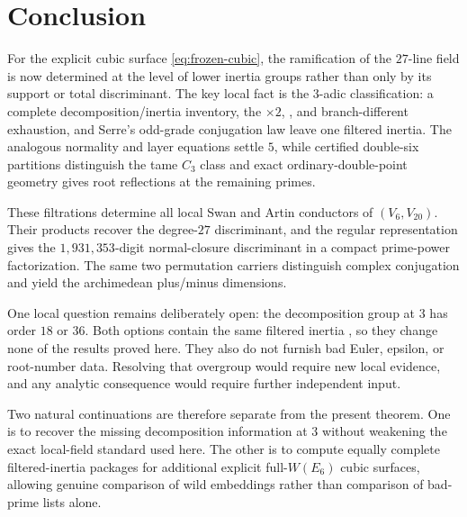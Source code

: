 \section{Conclusion}
\label{sec:conclusion}

For the explicit cubic surface \cref{eq:frozen-cubic}, the ramification of
the $27$-line field is now determined at the level of lower inertia groups
rather than only by its support or total discriminant.  The key local fact is
the $3$-adic classification: a complete decomposition/inertia inventory, the
$\times2$, , and  branch-different exhaustion, and
Serre's odd-grade conjugation law leave one filtered inertia.  The analogous
normality and layer equations settle $5$, while certified double-six
partitions distinguish the tame $C_3$ class and exact ordinary-double-point
geometry gives root reflections at the remaining primes.

These filtrations determine all local Swan and Artin conductors of
$(V_6,V_{20})$.  Their products recover the degree-$27$ discriminant, and
the regular representation gives the $1{,}931{,}353$-digit normal-closure
discriminant in a compact prime-power factorization.  The same two
permutation carriers distinguish complex conjugation and yield the
archimedean plus/minus dimensions.

One local question remains deliberately open: the decomposition group at
$3$ has order $18$ or $36$.  Both options contain the same filtered inertia
, so they change none of the results proved here.  They also do not
furnish bad Euler, epsilon, or root-number data.  Resolving that overgroup
would require new local evidence, and any analytic consequence would require
further independent input.

Two natural continuations are therefore separate from the present theorem.
One is to recover the missing decomposition information at $3$ without
weakening the exact local-field standard used here.  The other is to compute
equally complete filtered-inertia packages for additional explicit
full-$W(E_6)$ cubic surfaces, allowing genuine comparison of wild embeddings
rather than comparison of bad-prime lists alone.

